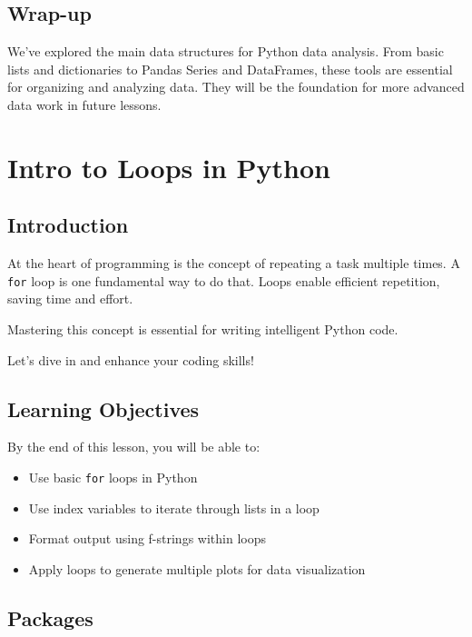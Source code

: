 \documentclass[
  letterpaper,
  DIV=11,
  numbers=noendperiod]{scrreprt}
\providecommand{\tightlist}{%
  \setlength{\itemsep}{0pt}\setlength{\parskip}{0pt}}\usepackage{longtable,booktabs,array}
\begin{document}
\section{Wrap-up}\label{wrap-up-2}

We've explored the main data structures for Python data analysis. From
basic lists and dictionaries to Pandas Series and DataFrames, these
tools are essential for organizing and analyzing data. They will be the
foundation for more advanced data work in future lessons.

\chapter{Intro to Loops in Python}\label{intro-to-loops-in-python}

\section{Introduction}\label{introduction-4}

At the heart of programming is the concept of repeating a task multiple
times. A \texttt{for} loop is one fundamental way to do that. Loops
enable efficient repetition, saving time and effort.

Mastering this concept is essential for writing intelligent Python code.

Let's dive in and enhance your coding skills!

\section{Learning Objectives}\label{learning-objectives-4}

By the end of this lesson, you will be able to:

\begin{itemize}
\tightlist
\item
  Use basic \texttt{for} loops in Python
\item
  Use index variables to iterate through lists in a loop
\item
  Format output using f-strings within loops
\item
  Apply loops to generate multiple plots for data visualization
\end{itemize}

\section{Packages}\label{packages}
\end{document}
